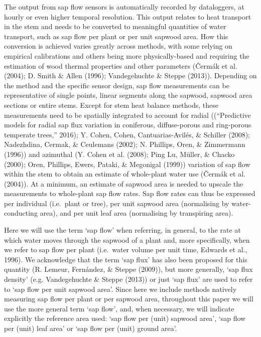 \documentclass[11pt,twoside]{reedthesis}
\begin{document}
The output from sap flow sensors is automatically recorded by
dataloggers, at hourly or even higher temporal resolution. This output
relates to heat transport in the stem and needs to be converted to
meaningful quantities of water transport, such as sap flow per plant or
per unit sapwood area. How this conversion is achieved varies greatly
across methods, with some relying on empirical calibrations and others
being more physically-based and requiring the estimation of wood thermal
properties and other parameters (Čermák et al. (2004); D. Smith \& Allen
(1996); Vandegehuchte \& Steppe (2013)). Depending on the method and the
specific sensor design, sap flow measurements can be representative of
single points, linear segments along the sapwood, sapwood area sections
or entire stems. Except for stem heat balance methods, these
measurements need to be spatially integrated to account for radial
((``Predictive models for radial sap flux variation in coniferous,
diffuse-porous and ring-porous temperate trees,'' 2016); Y. Cohen,
Cohen, Cantuarias-Avilés, \& Schiller (2008); Nadezhdina, Cermak, \&
Ceulemans (2002); N. Phillips, Oren, \& Zimmermann (1996)) and azimuthal
(Y. Cohen et al. (2008); Ping Lu, Müller, \& Chacko (2000); Oren,
Phillips, Ewers, Pataki, \& Megonigal (1999)) variation of sap flow
within the stem to obtain an estimate of whole-plant water use (Čermák
et al. (2004)). At a minimum, an estimate of sapwood area is needed to
upscale the measurements to whole-plant sap flow rates. Sap flow rates
can thus be expressed per individual (i.e.~plant or tree), per unit
sapwood area (normalising by water-conducting area), and per unit leaf
area (normalising by transpiring area).\par

Here we will use the term `sap flow' when referring, in general, to the
rate at which water moves through the sapwood of a plant and, more
specifically, when we refer to sap flow per plant (i.e.~water volume per
unit time, Edwards et al., 1996). We acknowledge that the term `sap
flux' has also been proposed for this quantity (R. Lemeur, Fernández, \&
Steppe (2009)), but more generally, `sap flux density' (e.g.
Vandegehuchte \& Steppe (2013)) or just `sap flux' are used to refer to
`sap flow per unit sapwood area'. Since here we include methods natively
measuring sap flow per plant or per sapwood area, throughout this paper
we will use the more general term `sap flow', and, when necessary, we
will indicate explicitly the reference area used: `sap flow per (unit)
sapwood area', `sap flow per (unit) leaf area' or `sap flow per (unit)
ground area'.\par 
\end{document}
